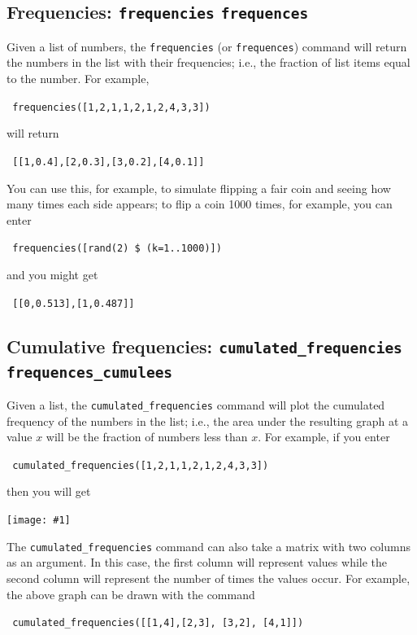 \documentclass[a4paper,11pt]{book}
\newcommand{\includeimage}[1]
{\texttt{[image: \#1]}}
\begin{document}
\subsection{Frequencies: \texttt{frequencies} \texttt{frequences}}

Given a list of numbers, the \texttt{frequencies} (or
\texttt{frequences}) command  will return
the numbers in the list with their frequencies; i.e., the fraction of
list items equal to the number. For example,
\begin{center}
  \tt
  frequencies([1,2,1,1,2,1,2,4,3,3])
\end{center}
will return
\begin{center}
  \tt
  [[1,0.4],[2,0.3],[3,0.2],[4,0.1]]
\end{center}

You can use this, for example, to simulate flipping a fair coin and
seeing how many times each side appears; to flip a coin 1000 times,
for example, you can enter
\begin{center}
  \tt
  frequencies([rand(2) \$ (k=1..1000)])
\end{center}
and you might get
\begin{center}
  \tt
  [[0,0.513],[1,0.487]]
\end{center}

\subsection{Cumulative frequencies: \texttt{cumulated\_frequencies} \texttt{frequences\_cumulees}}

Given a list, the \texttt{cumulated\_frequencies} command will plot
the cumulated frequency of the numbers in the list; i.e., the area
under the resulting graph at a value $x$ will be the fraction of
numbers less than $x$.  For example, if you enter
\begin{center}
  \tt
  cumulated\_frequencies([1,2,1,1,2,1,2,4,3,3])
\end{center}
then you will get
\begin{center}
  \includeimage{xcas-cumfreq1.png}
\end{center}

The \texttt{cumulated\_frequencies} command can also take a matrix
with two columns as an argument.  In this case, the first column will
represent values while the second column will represent the number of
times the values occur.  For example, the above graph can be drawn
with the command
\begin{center}
  \tt
    cumulated\_frequencies([[1,4],[2,3], [3,2], [4,1]])
\end{center}
\end{document}
